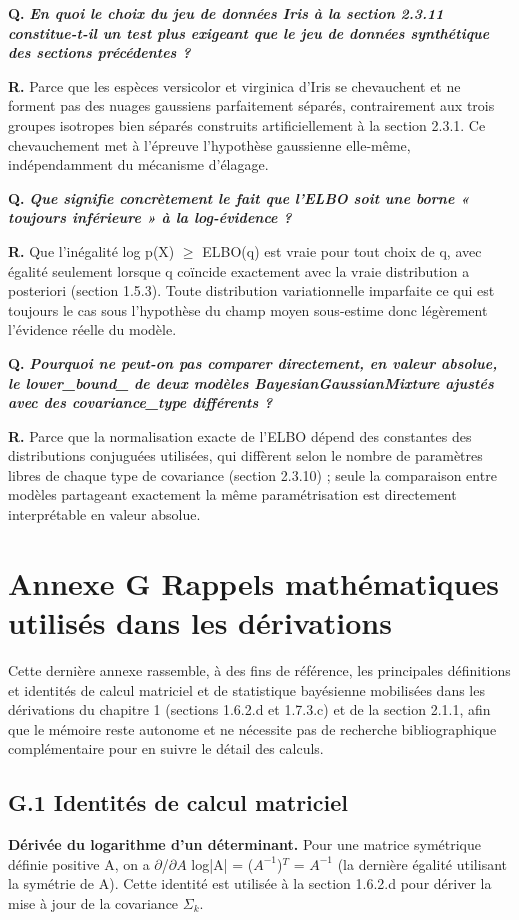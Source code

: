 \textbf{Q. }\textbf{\emph{En quoi le choix du jeu de données Iris à la section 2.3.11 constitue-t-il un test plus exigeant que le jeu de données synthétique des sections précédentes ?}}

\textbf{R. }Parce que les espèces versicolor et virginica d'Iris se chevauchent et ne forment pas des nuages gaussiens parfaitement séparés, contrairement aux trois groupes isotropes bien séparés construits artificiellement à la section 2.3.1. Ce chevauchement met à l'épreuve l'hypothèse gaussienne elle-même, indépendamment du mécanisme d'élagage.

\textbf{Q. }\textbf{\emph{Que signifie concrètement le fait que l'ELBO soit une borne « toujours inférieure » à la log-évidence ?}}

\textbf{R. }Que l'inégalité log p(X) $\geq $ ELBO(q) est vraie pour tout choix de q, avec égalité seulement lorsque q coïncide exactement avec la vraie distribution a posteriori (section 1.5.3). Toute distribution variationnelle imparfaite  ce qui est toujours le cas sous l'hypothèse du champ moyen  sous-estime donc légèrement l'évidence réelle du modèle.

\textbf{Q. }\textbf{\emph{Pourquoi ne peut-on pas comparer directement, en valeur absolue, le lower\_bound\_ de deux modèles BayesianGaussianMixture ajustés avec des covariance\_type différents ?}}

\textbf{R. }Parce que la normalisation exacte de l'ELBO dépend des constantes des distributions conjuguées utilisées, qui diffèrent selon le nombre de paramètres libres de chaque type de covariance (section 2.3.10) ; seule la comparaison entre modèles partageant exactement la même paramétrisation est directement interprétable en valeur absolue.

\section*{Annexe G  Rappels mathématiques utilisés dans les dérivations}
Cette dernière annexe rassemble, à des fins de référence, les principales définitions et identités de calcul matriciel et de statistique bayésienne mobilisées dans les dérivations du chapitre 1 (sections 1.6.2.d et 1.7.3.c) et de la section 2.1.1, afin que le mémoire reste autonome et ne nécessite pas de recherche bibliographique complémentaire pour en suivre le détail des calculs.

\subsection*{G.1 Identités de calcul matriciel}
\textbf{Dérivée du logarithme d'un déterminant. }Pour une matrice symétrique définie positive A, on a $\partial $/$\partial A$ log|A| = ($A^{-1}$)$^{T}$ = $A^{-1}$ (la dernière égalité utilisant la symétrie de A). Cette identité est utilisée à la section 1.6.2.d pour dériver la mise à jour de la covariance $\Sigma _{k}$.

